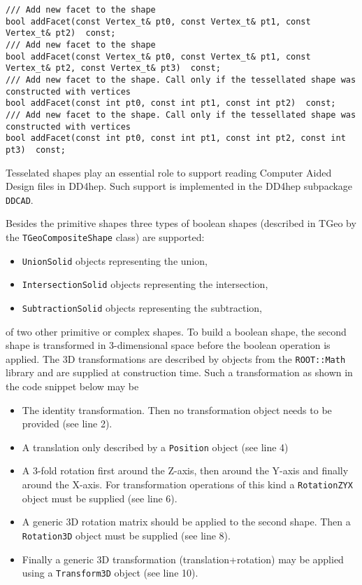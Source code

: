 \begin{itemize}
\begin{verbatim}
/// Add new facet to the shape
bool addFacet(const Vertex_t& pt0, const Vertex_t& pt1, const Vertex_t& pt2)  const;
/// Add new facet to the shape
bool addFacet(const Vertex_t& pt0, const Vertex_t& pt1, const Vertex_t& pt2, const Vertex_t& pt3)  const;
/// Add new facet to the shape. Call only if the tessellated shape was constructed with vertices
bool addFacet(const int pt0, const int pt1, const int pt2)  const;
/// Add new facet to the shape. Call only if the tessellated shape was constructed with vertices
bool addFacet(const int pt0, const int pt1, const int pt2, const int pt3)  const;
\end{verbatim}
Tesselated shapes play an essential role to support reading Computer Aided Design files in DD4hep. Such support is implemented in the DD4hep subpackage \texttt{DDCAD}.

\end{itemize}

Besides the primitive shapes three types of boolean shapes (described in TGeo by the \texttt{TGeoCompositeShape} class) are supported:

\begin{itemize}
\item \texttt{UnionSolid} objects representing the union,
\item \texttt{IntersectionSolid} objects representing the intersection,
\item \texttt{SubtractionSolid} objects representing the subtraction,
\end{itemize}

of two other primitive or complex shapes. To build a boolean shape, the second shape is transformed in 3-dimensional space before the boolean operation is applied. The 3D transformations are described by objects from the \texttt{ROOT::Math} library and are supplied at construction time.  Such a transformation as shown in the code snippet below may be 

\begin{itemize}
\item The identity transformation. Then no transformation object needs to be provided (see line 2).
\item A translation only described by a \texttt{Position} object (see line 4)
\item A 3-fold rotation first around the Z-axis, then around the Y-axis and finally around the X-axis. For transformation operations of this kind a \texttt{RotationZYX} object must be supplied (see line 6).
\item A generic 3D rotation matrix should be applied to the second shape. Then a \texttt{Rotation3D} object must be supplied (see line 8).
\item Finally a generic 3D transformation (translation+rotation) may be applied using a \texttt{Transform3D} object (see line 10).
\end{itemize}


